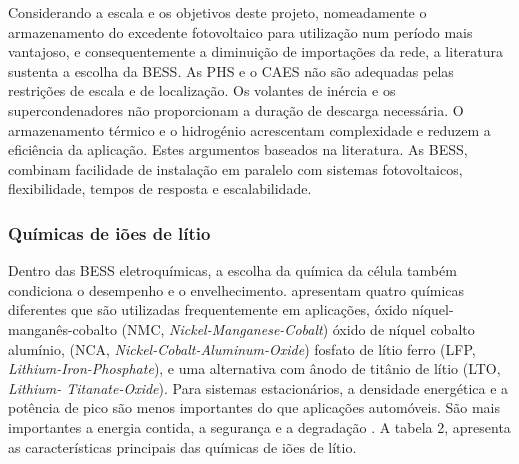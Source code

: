 Considerando a escala e os objetivos deste projeto, nomeadamente o armazenamento do excedente fotovoltaico para utilização num período mais vantajoso, e consequentemente a diminuição de importações da rede, a literatura sustenta a escolha da BESS. As PHS e o CAES não são adequadas pelas restrições de escala e de localização. Os volantes de inércia e os supercondenadores não proporcionam a duração de descarga necessária. O armazenamento térmico e o hidrogénio acrescentam complexidade e reduzem a eficiência da aplicação. Estes argumentos baseados na literatura. As BESS, combinam facilidade de instalação em paralelo com sistemas fotovoltaicos, flexibilidade, tempos de resposta e escalabilidade. 

\subsubsection{Químicas de iões de lítio}
\label{sec:Ch2.1.1.1}

Dentro das BESS eletroquímicas, a escolha da química da célula também condiciona o desempenho e o envelhecimento. \textcite{ Hesse2017} apresentam quatro químicas diferentes que são utilizadas frequentemente em aplicações, óxido níquel-manganês-cobalto (NMC, \textit{Nickel-Manganese-Cobalt}) óxido de níquel cobalto alumínio, (NCA, \textit{Nickel-Cobalt-Aluminum-Oxide}) fosfato de lítio ferro (LFP, \textit{Lithium-Iron-Phosphate}), e uma alternativa com ânodo de titânio de lítio (LTO, \textit{Lithium- Titanate-Oxide}). Para sistemas estacionários, a densidade energética e a potência de pico são menos importantes do que aplicações automóveis. São mais importantes a energia contida, a segurança e a degradação \cite{ Hesse2017}. A tabela 2, apresenta as características principais das químicas de iões de lítio. 



